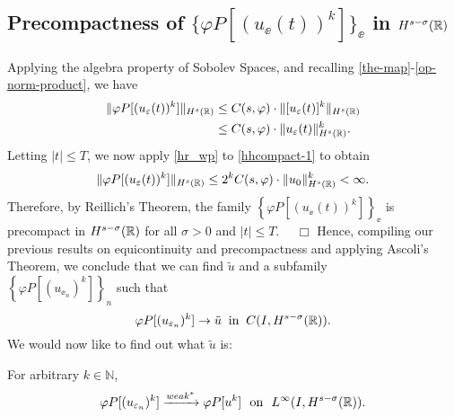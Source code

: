 \subsection{Precompactness of $\{\varphi P [(u_\ee(t))^k]\}_\ee$ in
$H^{s-\sigma  }(\mathbb{R})$}
Applying the algebra property of Sobolev
Spaces, and recalling \eqref{the-map}-\eqref{op-norm-product}, we have
\begin{equation}
\begin{split}
\label{hhcompact-1}
\|\varphi P [(u_\varepsilon(t))^k]\|_{H^{s}(\mathbb{R})}
& \le  C(s, \varphi) \cdot \|[u_\varepsilon(t)]^k\|_{H^{s}(\mathbb{R})}
\\
& \le C(s, \varphi) \cdot \|u_\varepsilon(t)\|^k_{H^{s}(\mathbb{R})}.
\end{split}
\end{equation}
%
Letting $|t| \le T$, we now apply \cref{hr_wp} to
\eqref{hhcompact-1} to obtain
\begin{equation*}
\begin{split}
\|\varphi P [(u_\varepsilon(t))^k]\|_{H^{s}(\mathbb{R})}
\le 2^k C(s, \varphi) \cdot  \|u_0 \|^k_{H^s(\mathbb{R})} < \infty.
\end{split}
\end{equation*}
Therefore, by Reillich's Theorem, the family $\left\{
\varphi P [(u_\ee(t))^k] \right\}_\ee$ is
precompact in $H^{s- \sigma }(\mathbb{R})$ for all $\sigma > 0$ and $|t| \le T$. $\quad
\Box$ 
Hence, compiling our previous results on equicontinuity and precompactness
and applying Ascoli's Theorem, we
conclude that we can find $\tilde{u}$ and a subfamily 
\\ $\left\{
\varphi P [(u_{\ee_n})^k]
\right\}_n$ such that
\begin{equation}
\label{hhstrong-conv-of-u_ep}
\varphi P [(u_{\varepsilon_n})^k] \to \tilde{u}
\; \; \text{in} \; \; C(I, H^{s-\sigma}(\mathbb{R})).
\end{equation}
%
%
We would now like to find out what $\tilde{u}$ is:
%
%
%
\begin{lemma}
\label{hhlem:crit-conv}
For arbitrary $k \in \mathbb{N}$,
\begin{equation}
\begin{split}
\varphi P [(u_{\varepsilon_n})^k] \xrightarrow{weak^*}
\varphi P [u^k] \ \ \text{on} \ \ L^\infty(I,
H^{s-\sigma}(\mathbb{R})).
\label{hhcrit-conv-est}
\end{split}
\end{equation}
\end{lemma}
